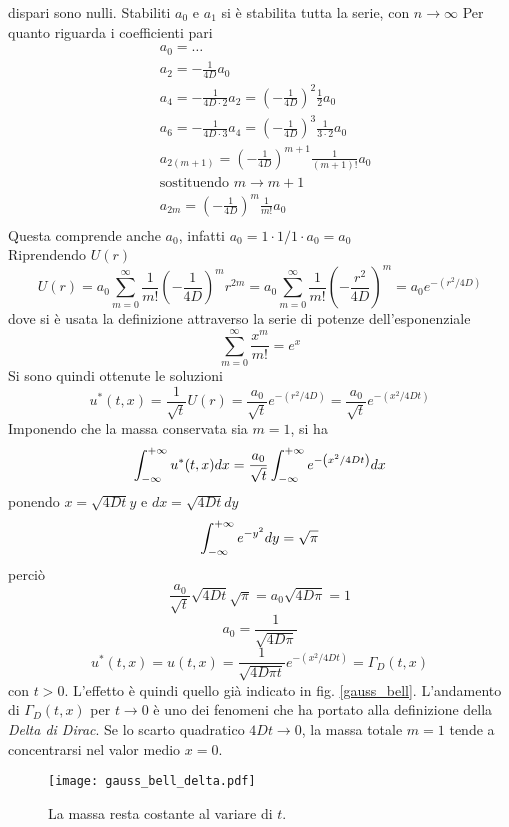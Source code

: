 dispari sono nulli.
Stabiliti $a_0$ e $a_1$ si \`e stabilita tutta la serie, con $n\rightarrow
\infty$
Per quanto riguarda i coefficienti pari
\begin{align*}
	& a_0=\ldots \\
	& a_2= - \frac{1}{4D} a_0 \\
	& a_4= - \frac{1}{4D \cdot 2} a_2 = \left( -\frac{1}{4D} \right)^2
	\frac{1}{2} a_0 \\
	& a_6= - \frac{1}{4D \cdot 3} a_4 = \left( -\frac{1}{4D} \right)^3
	\frac{1}{3 \cdot 2} a_0 \\
	& a_{2(m+1)}= \left( -\frac{1}{4D} \right)^{m+1}
	\frac{1}{(m+1)!} a_0 \\
	& \text{sostituendo }m \rightarrow m+1 \\
	& a_{2m}= \left( -\frac{1}{4D} \right)^{m}
	\frac{1}{m!} a_0 \\
\end{align*}
Questa comprende anche $a_0$, infatti $a_0= 1 \cdot 1/1 \cdot a_0= a_0$\\
Riprendendo $U(r)$
\[
	U(r)= a_0 \sum_{m=0}^{\infty} \frac{1}{m!}
	\left( -\frac{1}{4D} \right)^m r^{2m}
	= a_0 \sum_{m=0}^{\infty} \frac{1}{m!}
	\left( -\frac{r^2}{4D} \right)^m
	= a_0 e^{- \left( r^2/4D \right)}
\]
dove si \`e usata la definizione attraverso la serie di potenze
dell'esponenziale
\[
	\sum_{m=0}^{\infty} \frac{x^m}{m!}= e^x
\]
Si sono quindi ottenute le soluzioni
\[
	u^*(t,x)= \frac{1}{\sqrt{t}}U(r)= \frac{a_0}{\sqrt{t}}
	e^{- \left( r^2/4D \right)}
	= \frac{a_0}{\sqrt{t}} e^{- \left( x^2/4Dt \right)}
\]
Imponendo che la massa conservata sia $m=1$, si ha
\[
	\int_{- \infty}^{+ \infty} u^*(t,x) dx= \frac{a_0}{\sqrt{t}}
	\int_{- \infty}^{+ \infty} e^{-\left( x^2/4Dt \right)} dx
\]
ponendo $x= \sqrt{4Dt}y$ e $dx= \sqrt{4Dt} dy$
\[
	\int_{- \infty}^{+ \infty} e^{-y^2}dy= \sqrt{\pi}
\]
perci\`o
\[
	\frac{a_0}{\sqrt{t}}\sqrt{4Dt}\sqrt{\pi}=a_0\sqrt{4D\pi}=1
\]
\[
	a_0= \frac{1}{\sqrt{4D\pi}}
\]
\[
	u^*(t,x)= u(t,x)= \frac{1}{\sqrt{4D\pi t}}
	e^{-\left( x^2/4Dt \right)}
	= \Gamma_D(t,x)
\]
con $t>0$. L'effetto \`e quindi quello gi\`a indicato in fig. \ref{gauss_bell}.
L'andamento di $\Gamma_D(t,x)$ per $t \rightarrow 0$ \`e uno dei fenomeni che
ha portato alla definizione della \textit{Delta di Dirac}.
Se lo scarto quadratico $4Dt \rightarrow 0$, la massa totale $m=1$ tende
a concentrarsi nel valor medio $x=0$.
\begin{figure}[H]
	\centering
	\texttt{[image: gauss\_bell\_delta.pdf]}
	\caption{La massa resta costante al variare di $t$.}
	\label{gauss_bell_delta}
\end{figure}
